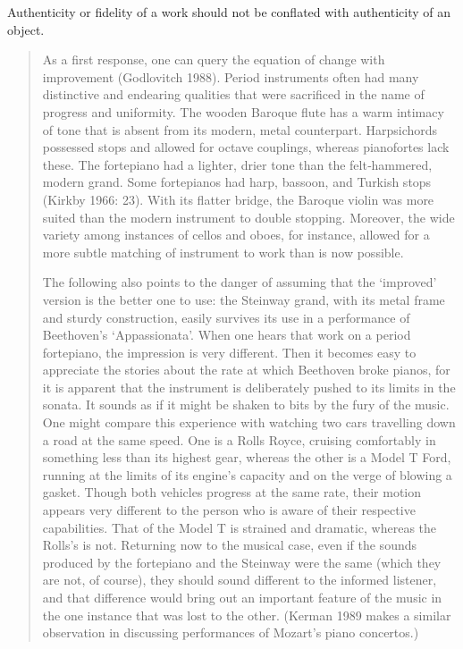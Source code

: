 Authenticity or fidelity of a work should not be conflated with authenticity of
an object.

\begin{quotation}
As a first response, one can query the equation of change with improvement
(Godlovitch 1988). Period instruments often had many distinctive and endearing
qualities that were sacrificed in the name of progress and uniformity. The
wooden Baroque flute has a warm intimacy of tone that is absent from its modern,
metal counterpart. Harpsichords possessed stops and allowed for octave
couplings, whereas pianofortes lack these. The fortepiano had a lighter, drier
tone than the felt‐hammered, modern grand. Some fortepianos had harp, bassoon,
and Turkish stops (Kirkby 1966: 23). With its flatter bridge, the Baroque violin
was more suited than the modern instrument to double stopping. Moreover, the
wide variety among instances of cellos and oboes, for instance, allowed for a
more subtle matching of instrument to work than is now possible.

The following also points to the danger of assuming that the ‘improved’ version
is the better one to use: the Steinway grand, with its metal frame and sturdy
construction, easily survives its use in a performance of Beethoven's
‘Appassionata’. When one hears that work on a period fortepiano, the impression
is very different. Then it becomes easy to appreciate the stories about the rate
at which Beethoven broke pianos, for it is apparent that the instrument is
deliberately pushed to its limits in the sonata. It sounds as if it might be
shaken to bits by the fury of the music. One might compare this experience with
watching two cars travelling down a road at the same speed. One is a Rolls
Royce, cruising comfortably in something less than its highest gear, whereas the
other is a Model T Ford, running at the limits of its engine's capacity and on
the verge of blowing a gasket. Though both vehicles progress at the same rate,
their motion appears very different to the person who is aware of their
respective capabilities. That of the Model T is strained and dramatic, whereas
the Rolls's is not. Returning now to the musical case, even if the sounds
produced by the fortepiano and the Steinway were the same (which they are not,
of course), they should sound different to the informed listener, and that
difference would bring out an important feature of the music in the one instance
that was lost to the other. (Kerman 1989 makes a similar observation in
discussing performances of Mozart's piano concertos.)
\end{quotation}

